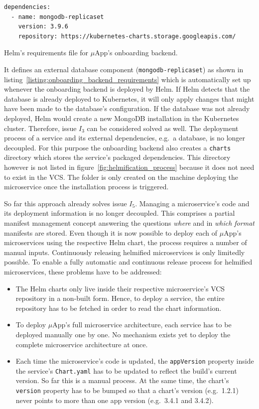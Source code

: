 \begin{listing}[H]
  \begin{verbatim}
dependencies:
  - name: mongodb-replicaset
    version: 3.9.6
    repository: https://kubernetes-charts.storage.googleapis.com/
  \end{verbatim}
  \caption{Helm's requirements file for $\mu$App's onboarding backend.}%
  \label{listing:onboarding_backend_requirements}
\end{listing}

It defines an external database component (\texttt{mongodb-replicaset}) as
shown in listing~\ref{listing:onboarding_backend_requirements} which is
automatically set up whenever the onboarding backend is deployed by Helm. If
Helm detects that the database is already deployed to Kubernetes, it will only
apply changes that might have been made to the database's configuration. If the
database was not already deployed, Helm would create a new MongoDB installation
in the Kubernetes cluster. Therefore, issue $I_3$ can be considered solved as
well. The deployment process of a service and its external dependencies, e.g.\
a database, is no longer decoupled.  For this purpose the onboarding backend
also creates a \texttt{charts} directory which stores the service's packaged
dependencies. This directory however is not listed in
figure~\ref{fig:helmification_process} because it does not need to exist in the
\ac{VCS}. The folder is only created on the machine deploying the microservice
once the installation process is triggered.

So far this approach already solves issue $I_5$. Managing a microservice's code
and its deployment information is no longer decoupled. This comprises a partial
manifest management concept answering the questions \textit{where} and in
\textit{which format} manifests are stored. Even though it is now possible to
deploy each of $\mu$App's microservices using the respective Helm chart, the
process requires a number of manual inputs. Continuously releasing helmified
microservices is only limitedly possible. To enable a fully automatic and
continuous release process for helmified microservices, these problems have to
be addressed:

\begin{itemize}
  \item The Helm charts only live inside their respective microservice's
    \ac{VCS} repository in a non-built form. Hence, to deploy a service, the
    entire repository has to be fetched in order to read the chart information.
  \item To deploy $\mu$App's full microservice architecture, each service has
    to be deployed manually one by one. No mechanism exists yet to deploy the
    complete microservice architecture at once.
  \item Each time the microservice's code is updated, the \texttt{appVersion}
    property inside the service's \texttt{Chart.yaml} has to be updated to
    reflect the build's current version. So far this is a manual process. At
    the same time, the chart's \texttt{version} property has to be bumped so
    that a chart's version (e.g.\ 1.2.1) never points to more than one app
    version (e.g.\ 3.4.1 and 3.4.2).
\end{itemize}

